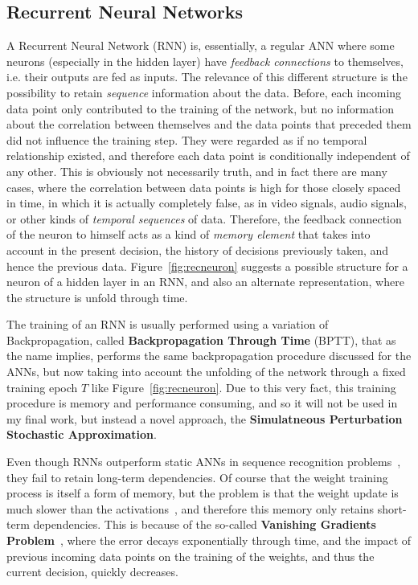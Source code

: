 \subsection{Recurrent Neural Networks}\label{sec:theorBack_rnn}
A Recurrent Neural Network (RNN) is, essentially, a regular ANN where some neurons (especially in the hidden layer) have \emph{feedback connections} to themselves, i.e. their outputs are fed as inputs. The relevance of this different structure is the possibility to retain \emph{sequence} information about the data. Before, each incoming data point only contributed to the training of the network, but no information about the correlation between themselves and the data points that preceded them did not influence the training step. They were regarded as if no temporal relationship existed, and therefore each data point is conditionally independent of any other. This is obviously not necessarily truth, and in fact there are many cases, where the correlation between data points is high for those closely spaced in time, in which it is actually completely false, as in video signals, audio signals, or other kinds of \emph{temporal sequences} of data. Therefore, the feedback connection of the neuron to himself acts as a kind of \emph{memory element} that takes into account in the present decision, the history of decisions previously taken, and hence the previous data. 
Figure~\ref{fig:recneuron} suggests a possible structure for a neuron of a hidden layer in an RNN, and also an alternate representation, where the structure is unfold through time.


The training of an RNN is usually performed using a variation of Backpropagation, called \textbf{Backpropagation Through Time} (BPTT), that as the name implies, performs the same backpropagation procedure discussed for the ANNs, but now taking into account the unfolding of the network through a fixed training epoch $T$ like Figure~\ref{fig:recneuron}. Due to this very fact, this training procedure is memory and performance consuming, and so it will not be used in my final work, but instead a novel approach, the \textbf{Simulatneous Perturbation Stochastic Approximation}. 

Even though RNNs outperform static ANNs in sequence recognition problems~\cite{Bengio1991}, they fail to retain long-term dependencies. Of course that the weight training process is itself a form of memory, but the problem is that the weight update is much slower than the activations~\cite{Yoshua01}, and therefore this memory only retains short-term dependencies. This is because of the so-called \textbf{Vanishing Gradients Problem}~\cite{Yoshua94,Yoshua01}, where the error decays exponentially through time, and the impact of previous incoming data points on the training of the weights, and thus the current decision, quickly decreases. 


